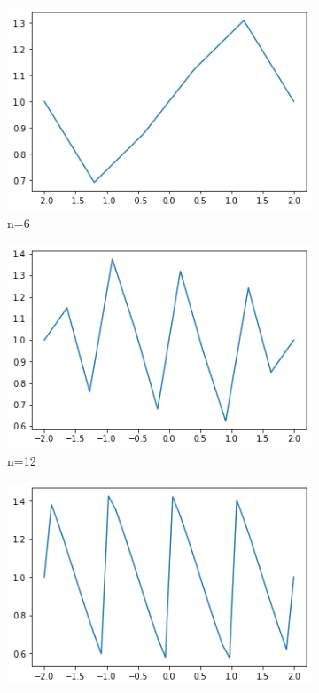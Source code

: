 \documentclass{article}
\begin{document}
\begin{figure}[h!]
	\centering
	\begin{subfigure}[b]{0.2\linewidth}
		\includegraphics[width=\linewidth]{img/f1_n6.png}
		\caption{n=6}
	\end{subfigure}
	\begin{subfigure}[b]{0.2\linewidth}
		\includegraphics[width=\linewidth]{img/f1_n12.png}
		\caption{n=12}
	\end{subfigure}
	\begin{subfigure}[b]{0.2\linewidth}
		\includegraphics[width=\linewidth]{img/f1_n36.png}

\end{subfigure}
\end{figure}
\end{document}
